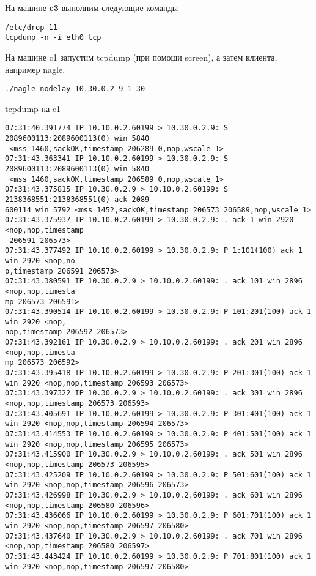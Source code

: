 \documentclass[a4paper,12pt]{article}
\begin{document}
На машине \textbf{c3} выполним следующие команды
\begin{Verbatim}
/etc/drop 11
tcpdump -n -i eth0 tcp
\end{Verbatim}

На машине c1 запустим tcpdump (при помощи screen), а затем клиента, например nagle.
\begin{Verbatim}
./nagle nodelay 10.30.0.2 9 1 30
\end{Verbatim}

tcpdump на c1
\begin{Verbatim}
07:31:40.391774 IP 10.10.0.2.60199 > 10.30.0.2.9: S 2089600113:2089600113(0) win 5840
 <mss 1460,sackOK,timestamp 206289 0,nop,wscale 1>
07:31:43.363341 IP 10.10.0.2.60199 > 10.30.0.2.9: S 2089600113:2089600113(0) win 5840
 <mss 1460,sackOK,timestamp 206589 0,nop,wscale 1>
07:31:43.375815 IP 10.30.0.2.9 > 10.10.0.2.60199: S 2138368551:2138368551(0) ack 2089
600114 win 5792 <mss 1452,sackOK,timestamp 206573 206589,nop,wscale 1>
07:31:43.375937 IP 10.10.0.2.60199 > 10.30.0.2.9: . ack 1 win 2920 <nop,nop,timestamp
 206591 206573>
07:31:43.377492 IP 10.10.0.2.60199 > 10.30.0.2.9: P 1:101(100) ack 1 win 2920 <nop,no
p,timestamp 206591 206573>
07:31:43.380591 IP 10.30.0.2.9 > 10.10.0.2.60199: . ack 101 win 2896 <nop,nop,timesta
mp 206573 206591>
07:31:43.390514 IP 10.10.0.2.60199 > 10.30.0.2.9: P 101:201(100) ack 1 win 2920 <nop,
nop,timestamp 206592 206573>
07:31:43.392161 IP 10.30.0.2.9 > 10.10.0.2.60199: . ack 201 win 2896 <nop,nop,timesta
mp 206573 206592>
07:31:43.395418 IP 10.10.0.2.60199 > 10.30.0.2.9: P 201:301(100) ack 1 win 2920 <nop,nop,timestamp 206593 206573>
07:31:43.397322 IP 10.30.0.2.9 > 10.10.0.2.60199: . ack 301 win 2896 <nop,nop,timestamp 206573 206593>
07:31:43.405691 IP 10.10.0.2.60199 > 10.30.0.2.9: P 301:401(100) ack 1 win 2920 <nop,nop,timestamp 206594 206573>
07:31:43.414553 IP 10.10.0.2.60199 > 10.30.0.2.9: P 401:501(100) ack 1 win 2920 <nop,nop,timestamp 206595 206573>
07:31:43.415900 IP 10.30.0.2.9 > 10.10.0.2.60199: . ack 501 win 2896 <nop,nop,timestamp 206573 206595>
07:31:43.425209 IP 10.10.0.2.60199 > 10.30.0.2.9: P 501:601(100) ack 1 win 2920 <nop,nop,timestamp 206596 206573>
07:31:43.426998 IP 10.30.0.2.9 > 10.10.0.2.60199: . ack 601 win 2896 <nop,nop,timestamp 206580 206596>
07:31:43.436066 IP 10.10.0.2.60199 > 10.30.0.2.9: P 601:701(100) ack 1 win 2920 <nop,nop,timestamp 206597 206580>
07:31:43.437640 IP 10.30.0.2.9 > 10.10.0.2.60199: . ack 701 win 2896 <nop,nop,timestamp 206580 206597>
07:31:43.443424 IP 10.10.0.2.60199 > 10.30.0.2.9: P 701:801(100) ack 1 win 2920 <nop,nop,timestamp 206597 206580>

\end{Verbatim}
\end{document}
